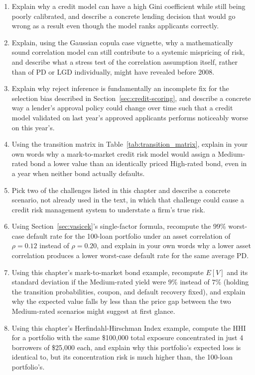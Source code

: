 \documentclass[../ai_in_finance]{subfiles}
\begin{document}
\begin{enumerate}
    \item Explain why a credit model can have a high Gini coefficient while still being poorly calibrated, and describe a concrete lending decision that would go wrong as a result even though the model ranks applicants correctly.
    \item Explain, using the Gaussian copula case vignette, why a mathematically sound correlation model can still contribute to a systemic mispricing of risk, and describe what a stress test of the correlation assumption itself, rather than of PD or LGD individually, might have revealed before 2008.
    \item Explain why reject inference is fundamentally an incomplete fix for the selection bias described in Section~\ref{sec:credit-scoring}, and describe a concrete way a lender's approval policy could change over time such that a credit model validated on last year's approved applicants performs noticeably worse on this year's.
    \item Using the transition matrix in Table~\ref{tab:transition_matrix}, explain in your own words why a mark-to-market credit risk model would assign a Medium-rated bond a lower value than an identically priced High-rated bond, even in a year when neither bond actually defaults.
    \item Pick two of the challenges listed in this chapter and describe a concrete scenario, not already used in the text, in which that challenge could cause a credit risk management system to understate a firm's true risk.
    \item Using Section~\ref{sec:vasicek}'s single-factor formula, recompute the 99\% worst-case default rate for the 100-loan portfolio under an asset correlation of $\rho=0.12$ instead of $\rho=0.20$, and explain in your own words why a lower asset correlation produces a lower worst-case default rate for the same average PD.
    \item Using this chapter's mark-to-market bond example, recompute $E[V]$ and its standard deviation if the Medium-rated yield were $9\%$ instead of $7\%$ (holding the transition probabilities, coupon, and default recovery fixed), and explain why the expected value falls by less than the price gap between the two Medium-rated scenarios might suggest at first glance.
    \item Using this chapter's Herfindahl-Hirschman Index example, compute the HHI for a portfolio with the same \$100,000 total exposure concentrated in just 4 borrowers of \$25,000 each, and explain why this portfolio's expected loss is identical to, but its concentration risk is much higher than, the 100-loan portfolio's.

\end{enumerate}
\end{document}
